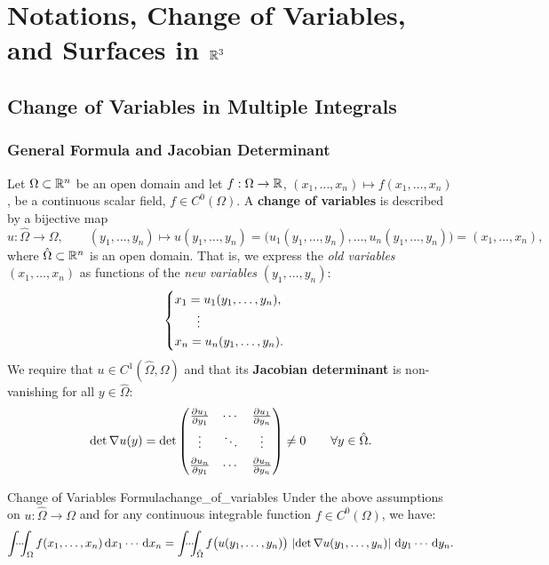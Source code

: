 \section{Notations, Change of Variables, and Surfaces in \texorpdfstring{$\mathbb{R}^3$}{R3}}

\subsection{Change of Variables in Multiple Integrals}

\subsubsection{General Formula and Jacobian Determinant}

Let $\Omega \subset \mathbb{R}^n$ be an open domain and let $f : \Omega \to \mathbb{R}$, $(x_1, \dots, x_n) \mapsto f(x_1, \dots, x_n)$, be a continuous scalar field, $f \in C^0(\Omega)$. A \textbf{change of variables} is described by a bijective map
\[
    u : \hat{\Omega} \to \Omega, \qquad (y_1, \dots, y_n) \mapsto u(y_1, \dots, y_n) = \big(u_1(y_1, \dots, y_n), \dots, u_n(y_1, \dots, y_n)\big) = (x_1, \dots, x_n),
\]
where $\hat{\Omega} \subset \mathbb{R}^n$ is an open domain. That is, we express the \emph{old variables} $(x_1, \dots, x_n)$ as functions of the \emph{new variables} $(y_1, \dots, y_n)$:
\[
    \begin{cases}
        x_1 = u_1(y_1, \dots, y_n), \\
        \hspace{1.8em}\vdots \\
        x_n = u_n(y_1, \dots, y_n).
    \end{cases}
\]
We require that $u \in C^1(\hat{\Omega}, \Omega)$ and that its \textbf{Jacobian determinant} is non-vanishing for all $y \in \hat{\Omega}$:
\[
    \det \nabla u(y) = \det \begin{pmatrix}
        \pdv{u_1}{y_1} & \cdots & \pdv{u_1}{y_n} \\[1ex]
        \vdots & \ddots & \vdots \\[1ex]
        \pdv{u_n}{y_1} & \cdots & \pdv{u_n}{y_n}
    \end{pmatrix} \neq 0 \qquad \forall y \in \hat{\Omega}.
\]

\begin{theoreme}{Change of Variables Formula}{change_of_variables}
Under the above assumptions on $u : \hat{\Omega} \to \Omega$ and for any continuous integrable function $f \in C^0(\Omega)$, we have:
\[
    \idotsint_{\Omega} f(x_1, \dots, x_n) \,\mathrm{d}x_1 \cdots \,\mathrm{d}x_n = \idotsint_{\hat{\Omega}} f\big(u(y_1, \dots, y_n)\big) \, \left\lvert\det \nabla u(y_1, \dots, y_n)\right\rvert \,\mathrm{d}y_1 \cdots \,\mathrm{d}y_n.
\]
\end{theoreme}

